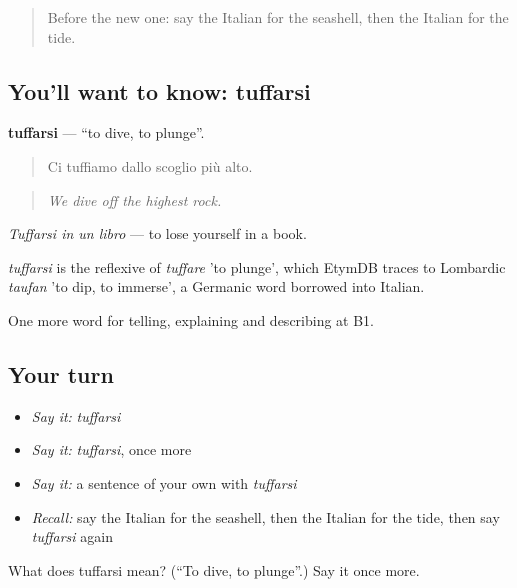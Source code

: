 \label{lesson:IT-C463-tuffarsi}



\begin{quote}
Before the new one: say the Italian for the seashell, then the Italian for the tide.
\end{quote}

\subsection*{You'll want to know: tuffarsi}
\textbf{tuffarsi} — \textquotedblleft{}to dive, to plunge\textquotedblright{}.

\begin{quote}
Ci tuffiamo dallo scoglio più alto.
\end{quote}

\begin{quote}
\emph{We dive off the highest rock.}
\end{quote}

\emph{Tuffarsi in un libro} — to lose yourself in a book.

\begin{cousinweb}
\emph{tuffarsi} is the reflexive of \emph{tuffare} 'to plunge', which EtymDB traces to Lombardic \emph{taufan} 'to dip, to immerse', a Germanic word borrowed into Italian.
\end{cousinweb}

\begin{grammarlens}[title={What you've built}]
One more word for telling, explaining and describing at B1.
\end{grammarlens}

\subsection*{Your turn}
\begin{itemize}
\raggedright
  \item \emph{Say it:} \emph{tuffarsi}
  \item \emph{Say it:} \emph{tuffarsi}, once more
  \item \emph{Say it:} a sentence of your own with \emph{tuffarsi}
  \item \emph{Recall:} say the Italian for the seashell, then the Italian for the tide, then say \emph{tuffarsi} again
\end{itemize}

\begin{tcolorbox}[breakable,colback=teal!4,colframe=teal!35!black,title={Before you move on}]
What does tuffarsi mean? (\textquotedblleft{}To dive, to plunge\textquotedblright{}.) Say it once more.
\end{tcolorbox}
